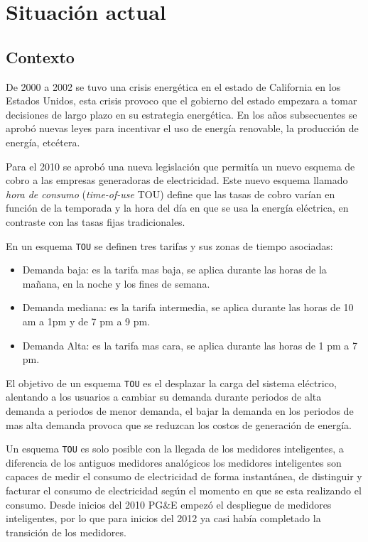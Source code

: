 \chapter{Situación actual}

\section{Contexto}
De 2000 a 2002 se tuvo una crisis energética en el estado de California en los
Estados Unidos, esta crisis provoco que el gobierno del estado empezara a
tomar decisiones de largo plazo en su estrategia energética. En los años
subsecuentes se aprobó nuevas leyes para incentivar el uso de energía renovable,
la producción de energía, etcétera.

Para el 2010 se aprobó una nueva legislación que permitía un nuevo esquema
de cobro a las empresas generadoras de electricidad. Este nuevo esquema
llamado \textit{hora de consumo} (\textit{time-of-use} TOU) define que las
tasas de cobro varían en función de la temporada y la hora del día en que
se usa la energía eléctrica, en contraste con las tasas fijas tradicionales.

En un esquema \texttt{TOU} se definen tres tarifas y sus zonas de tiempo asociadas:

\begin{itemize}
\item  Demanda baja: es la tarifa mas baja, se aplica durante las horas de la
  mañana, en la noche y los fines de semana.
\item Demanda mediana: es la tarifa intermedia, se aplica durante las horas de
  10 am a 1pm y de 7 pm a 9 pm.
\item Demanda Alta: es la tarifa mas cara, se aplica durante las horas de
  1 pm a 7 pm.
\end{itemize}

El objetivo de un esquema \texttt{TOU} es el desplazar la carga del sistema
eléctrico, alentando a los usuarios a cambiar su demanda durante periodos
de alta demanda a periodos de menor demanda, el bajar la demanda en los periodos
de mas alta demanda provoca que se reduzcan los costos de generación de energía.

Un esquema \texttt{TOU} es solo posible con la llegada de los medidores
inteligentes, a diferencia de los antiguos medidores analógicos los medidores
inteligentes son capaces de medir el consumo de electricidad de forma instantánea,
de distinguir y facturar el consumo de electricidad según el momento en que se
esta realizando el consumo. Desde inicios del 2010 PG\&E empezó el despliegue
de medidores inteligentes, por lo que para inicios del 2012 ya casi había
completado la transición de los medidores.

